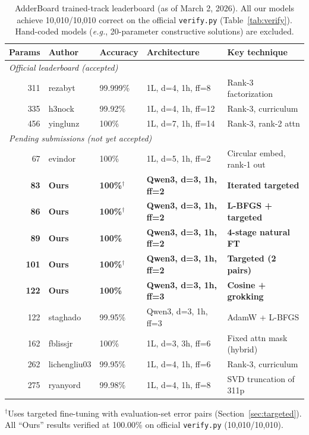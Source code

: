 \documentclass[11pt]{article}
\newcommand{\eg}{\emph{e.g.}}
\begin{document}
\begin{table}[t]
\centering
\caption{AdderBoard trained-track leaderboard (as of March 2, 2026).
All our models achieve 10,010/10,010 correct on the official
\texttt{verify.py} (Table~\ref{tab:verify}). Hand-coded models
(\eg, 20-parameter constructive solutions) are excluded.}
\label{tab:leaderboard}
\vspace{4pt}
\begin{tabular}{@{}rllll@{}}
\toprule
Params & Author & Accuracy & Architecture & Key technique \\
\midrule
\multicolumn{5}{l}{\textit{Official leaderboard (accepted)}} \\
311 & rezabyt   & 99.999\%  & 1L, d=4, 1h, ff=8  & Rank-3 factorization \\
335 & h3nock    & 99.92\%   & 1L, d=4, 1h, ff=12 & Rank-3, curriculum \\
456 & yinglunz  & 100\%     & 1L, d=7, 1h, ff=14 & Rank-3, rank-2 attn \\
\midrule
\multicolumn{5}{l}{\textit{Pending submissions (not yet accepted)}} \\
67  & evindor   & 100\%     & 1L, d=5, 1h, ff=2  & Circular embed, rank-1 out \\
\textbf{83}  & \textbf{Ours} & \textbf{100\%}$^\dagger$ & \textbf{Qwen3, d=3, 1h, ff=2} & \textbf{Iterated targeted} \\
\textbf{86}  & \textbf{Ours} & \textbf{100\%}$^\dagger$ & \textbf{Qwen3, d=3, 1h, ff=2} & \textbf{L-BFGS + targeted} \\
\textbf{89}  & \textbf{Ours} & \textbf{100\%} & \textbf{Qwen3, d=3, 1h, ff=2} & \textbf{4-stage natural FT} \\
\textbf{101} & \textbf{Ours} & \textbf{100\%}$^\dagger$ & \textbf{Qwen3, d=3, 1h, ff=2} & \textbf{Targeted (2 pairs)} \\
\textbf{122} & \textbf{Ours} & \textbf{100\%} & \textbf{Qwen3, d=3, 1h, ff=3} & \textbf{Cosine + grokking} \\
122 & staghado   & 99.95\%    & Qwen3, d=3, 1h, ff=3 & AdamW + L-BFGS \\
162 & fblissjr  & 100\%     & 1L, d=3, 3h, ff=6  & Fixed attn mask (hybrid) \\
262 & lichengliu03 & 99.95\% & 1L, d=4, 1h, ff=6 & Rank-3, curriculum \\
275 & ryanyord  & 99.98\%   & 1L, d=4, 1h, ff=8  & SVD truncation of 311p \\
\bottomrule
\end{tabular}

\smallskip
{\footnotesize $^\dagger$Uses targeted fine-tuning with evaluation-set error pairs (Section~\ref{sec:targeted}).
All ``Ours'' results verified at 100.00\% on official \texttt{verify.py} (10,010/10,010).}
\end{table}
\end{document}
